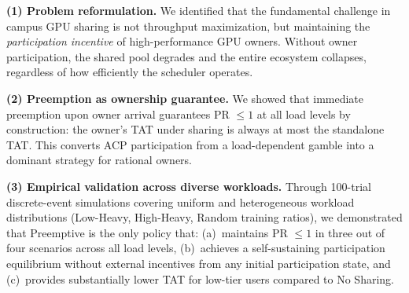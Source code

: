 \textbf{(1) Problem reformulation.}
We identified that the fundamental challenge in campus GPU sharing is not
throughput maximization, but maintaining the \emph{participation incentive}
of high-performance GPU owners.
Without owner participation, the shared pool degrades and the entire
ecosystem collapses, regardless of how efficiently the scheduler operates.


\textbf{(2) Preemption as ownership guarantee.}
We showed that immediate preemption upon owner arrival guarantees
PR $\leq 1$ at all load levels by construction:
the owner's TAT under sharing is always at most the standalone TAT.
This converts ACP participation from a load-dependent gamble
into a dominant strategy for rational owners.


\textbf{(3) Empirical validation across diverse workloads.}
Through 100-trial discrete-event simulations covering uniform and heterogeneous
workload distributions (Low-Heavy, High-Heavy, Random training ratios),
we demonstrated that Preemptive is the only policy that:
(a)~maintains PR $\leq 1$ in three out of four scenarios across all load levels,
(b)~achieves a self-sustaining participation equilibrium without external
incentives from any initial participation state, and
(c)~provides substantially lower TAT for low-tier users
compared to No Sharing.


